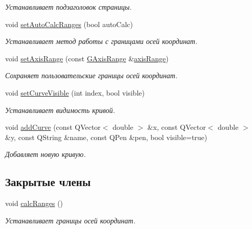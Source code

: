 \begin{DoxyCompactItemize}
\begin{DoxyCompactList}\small\item\em Устанавливает подзаголовок страницы. \end{DoxyCompactList}\item 
void \hyperlink{class_graph_sheet_a5ac1eac707300dc2e8d856e49bd797f3}{set\+Auto\+Calc\+Ranges} (bool auto\+Calc)
\begin{DoxyCompactList}\small\item\em Устанавливает метод работы с границами осей координат. \end{DoxyCompactList}\item 
void \hyperlink{class_graph_sheet_ae37cc5b56c35ae34ced47c6f21eebf45}{set\+Axis\+Range} (const \hyperlink{struct_g_axis_range}{G\+Axis\+Range} \&\hyperlink{class_graph_sheet_a36397b018c3c882a0704f3632eb010c7}{axis\+Range})\hypertarget{class_graph_sheet_ae37cc5b56c35ae34ced47c6f21eebf45}{}\label{class_graph_sheet_ae37cc5b56c35ae34ced47c6f21eebf45}

\begin{DoxyCompactList}\small\item\em Сохраняет пользовательские границы осей координат. \end{DoxyCompactList}\item 
void \hyperlink{class_graph_sheet_af8f3efaf2a6ba860b089bef15e07f403}{set\+Curve\+Visible} (int index, bool visible)
\begin{DoxyCompactList}\small\item\em Устанавливает видимость кривой. \end{DoxyCompactList}\item 
void \hyperlink{class_graph_sheet_abce999772aca9f5da197f13fd8912362}{add\+Curve} (const Q\+Vector$<$ double $>$ \&x, const Q\+Vector$<$ double $>$ \&y, const Q\+String \&name, const Q\+Pen \&pen, bool visible=true)
\begin{DoxyCompactList}\small\item\em Добавляет новую кривую. \end{DoxyCompactList}\end{DoxyCompactItemize}
\subsection*{Закрытые члены}
\begin{DoxyCompactItemize}
\item 
void \hyperlink{class_graph_sheet_adc73499b0d6b96dde2e3d1f829ec6273}{calc\+Ranges} ()
\begin{DoxyCompactList}\small\item\em Устанавливает границы осей координат. \end{DoxyCompactList}\end{DoxyCompactItemize}
